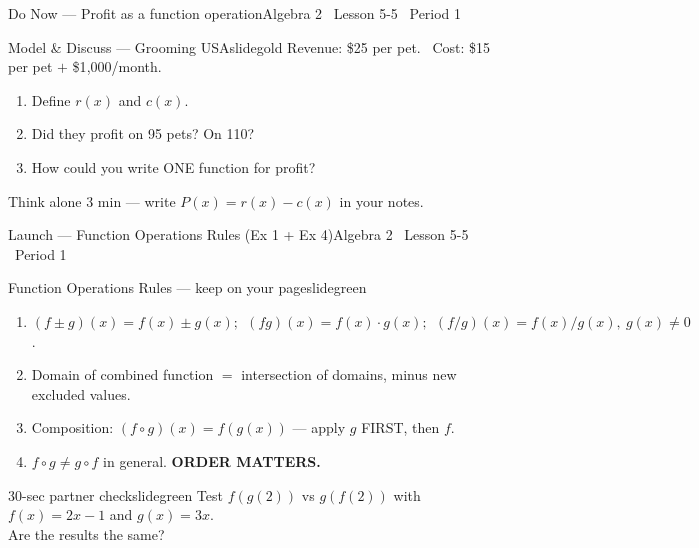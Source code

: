 \documentclass[aspectratio=169, 11pt]{beamer}
\begin{document}

\begin{frame}{Do Now --- Profit as a function operation}{Algebra 2 \textperiodcentered\ Lesson 5-5 \textperiodcentered\ Period 1}
\vspace{0.2cm}
\begin{projcard}{Model \& Discuss --- Grooming USA}{slidegold}
Revenue: \$25 per pet. \ Cost: \$15 per pet \(+\) \$1{,}000/month.

\vspace{0.2cm}
\begin{enumerate}
  \setlength{\itemsep}{0.1cm}
  \item Define \(r(x)\) and \(c(x)\).
  \item Did they profit on 95 pets? On 110?
  \item How could you write ONE function for profit?
\end{enumerate}

\vspace{0.1cm}
\small\textcolor{slidegray}{Think alone 3 min --- write \(P(x) = r(x) - c(x)\) in your notes.}
\end{projcard}
\end{frame}

\begin{frame}{Launch --- Function Operations Rules (Ex 1 + Ex 4)}{Algebra 2 \textperiodcentered\ Lesson 5-5 \textperiodcentered\ Period 1}
\vspace{0.15cm}
\begin{projcard}{Function Operations Rules --- keep on your page}{slidegreen}
\small
\begin{enumerate}
  \setlength{\itemsep}{0pt}
  \item \((f\pm g)(x) = f(x)\pm g(x);\ \ (fg)(x) = f(x)\cdot g(x);\ \ (f/g)(x) = f(x)/g(x),\ g(x)\neq 0\).
  \item Domain of combined function \(=\) intersection of domains, minus new excluded values.
  \item Composition: \((f\circ g)(x) = f(g(x))\) --- apply \(g\) FIRST, then \(f\).
  \item \(f\circ g \neq g\circ f\) in general. \textbf{ORDER MATTERS.}
\end{enumerate}
\end{projcard}

\vspace{-0.1cm}
\begin{projcard}{30-sec partner check}{slidegreen}
Test \(f(g(2))\) vs \(g(f(2))\) with \(f(x)=2x-1\) and \(g(x)=3x\).\\
Are the results the same?
\end{projcard}
\end{frame}
\end{document}

